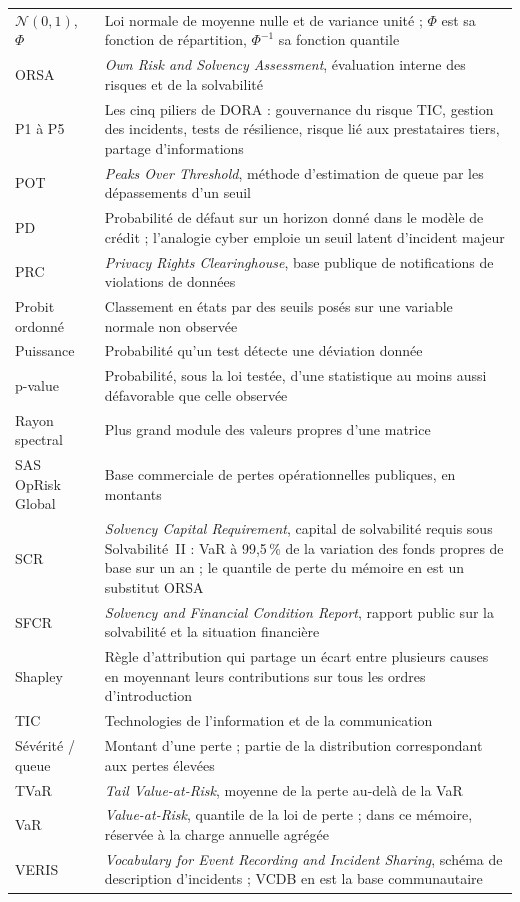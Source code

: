 \begin{center}
\begin{longtable}{@{}>{\raggedright\arraybackslash}p{2.6cm}>{\raggedright\arraybackslash}p{12.2cm}@{}}
$\mathcal N(0,1)$, $\Phi$ & Loi normale de moyenne nulle et de variance unité ; $\Phi$ est sa fonction de répartition, $\Phi^{-1}$ sa fonction quantile \\
ORSA & \emph{Own Risk and Solvency Assessment}, évaluation interne des risques et de la solvabilité \\
P1 à P5 & Les cinq piliers de DORA : gouvernance du risque TIC, gestion des incidents, tests de résilience, risque lié aux prestataires tiers, partage d'informations \\
POT & \emph{Peaks Over Threshold}, méthode d'estimation de queue par les dépassements d'un seuil \\
PD & Probabilité de défaut sur un horizon donné dans le modèle de crédit ; l'analogie cyber emploie un seuil latent d'incident majeur \\
PRC & \emph{Privacy Rights Clearinghouse}, base publique de notifications de violations de données \\
Probit ordonné & Classement en états par des seuils posés sur une variable normale non observée \\
Puissance & Probabilité qu'un test détecte une déviation donnée \\
p-value & Probabilité, sous la loi testée, d'une statistique au moins aussi défavorable que celle observée \\
Rayon spectral & Plus grand module des valeurs propres d'une matrice \\
SAS OpRisk Global & Base commerciale de pertes opérationnelles publiques, en montants \\
SCR & \emph{Solvency Capital Requirement}, capital de solvabilité requis sous Solvabilité~II : VaR à 99,5\,\% de la variation des fonds propres de base sur un an ; le quantile de perte du mémoire en est un substitut ORSA \\
SFCR & \emph{Solvency and Financial Condition Report}, rapport public sur la solvabilité et la situation financière \\
Shapley & Règle d'attribution qui partage un écart entre plusieurs causes en moyennant leurs contributions sur tous les ordres d'introduction \\
TIC & Technologies de l'information et de la communication \\
Sévérité / queue & Montant d'une perte ; partie de la distribution correspondant aux pertes élevées \\
TVaR & \emph{Tail Value-at-Risk}, moyenne de la perte au-delà de la VaR \\
VaR & \emph{Value-at-Risk}, quantile de la loi de perte ; dans ce mémoire, réservée à la charge annuelle agrégée \\
VERIS & \emph{Vocabulary for Event Recording and Incident Sharing}, schéma de description d'incidents ; VCDB en est la base communautaire \\
\bottomrule
\end{longtable}
\end{center}

